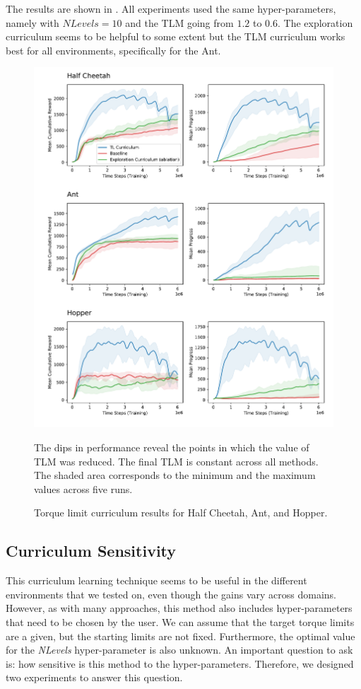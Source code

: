 The results are shown in . All experiments used the same hyper-parameters, namely with $NLevels=10$ and the \ac{TLM} going from $1.2$ to $0.6$. The exploration curriculum seems to be helpful to some extent but the \ac{TLM} curriculum works best for all environments, specifically for the Ant.

\begin{figure}
    \centering
    \includegraphics[width=130mm]{img/TorqueLimit_Envs.pdf}
    \caption{Torque limit curriculum results for Half Cheetah, Ant, and Hopper.}{The dips in performance reveal the points in which the value of \ac{TLM} was reduced. The final \ac{TLM} is constant across all methods. The shaded area corresponds to the minimum and the maximum values across five runs.}
    \label{fig:torque_limit_envs}
\end{figure}

\subsection{Curriculum Sensitivity}
\label{subsec:curr_sensitivity}

This curriculum learning technique seems to be useful in the different environments that we tested on, even though the gains vary across domains. However, as with many approaches, this method also includes hyper-parameters that need to be chosen by the user. We can assume that the target torque limits are a given, but the starting limits are not fixed. Furthermore, the optimal value for the \textit{NLevels} hyper-parameter is also unknown. An important question to ask is: how sensitive is this method to the hyper-parameters. Therefore, we designed two experiments to answer this question.


